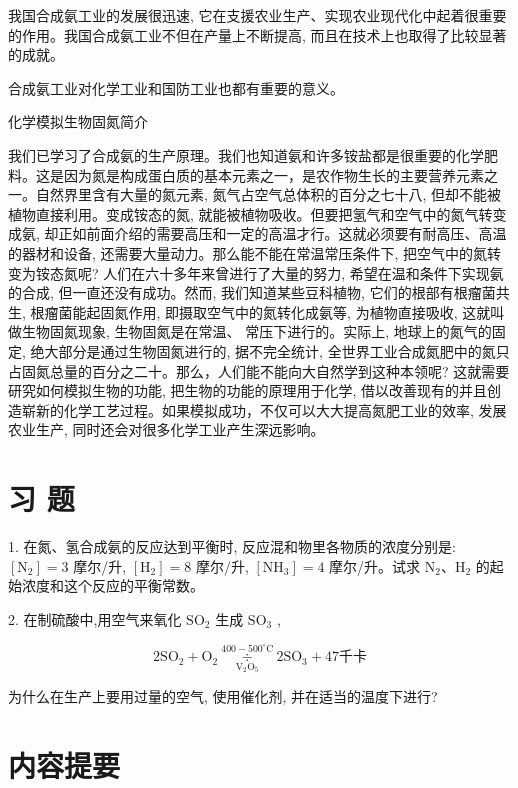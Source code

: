 \documentclass[10pt]{article}
\begin{document}
我国合成氨工业的发展很迅速, 它在支援农业生产、实现农业现代化中起着很重要的作用。我国合成氨工业不但在产量上不断提高, 而且在技术上也取得了比较显著的成就。

合成氨工业对化学工业和国防工业也都有重要的意义。

化学模拟生物固氮简介

我们已学习了合成氨的生产原理。我们也知道氨和许多铵盐都是很重要的化学肥料。这是因为氮是构成蛋白质的基本元素之一，是农作物生长的主要营养元素之一。自然界里含有大量的氮元素, 氮气占空气总体积的百分之七十八, 但却不能被植物直接利用。变成铵态的氮, 就能被植物吸收。但要把氢气和空气中的氮气转变成氨, 却正如前面介绍的需要高压和一定的高温才行。这就必须要有耐高压、高温的器材和设备, 还需要大量动力。那么能不能在常温常压条件下, 把空气中的氮转变为铵态氮呢? 人们在六十多年来曾进行了大量的努力, 希望在温和条件下实现氨的合成, 但一直还没有成功。然而, 我们知道某些豆科植物, 它们的根部有根瘤菌共生, 根瘤菌能起固氮作用, 即摄取空气中的氮转化成氨等, 为植物直接吸收, 这就叫做生物固氮现象, 生物固氮是在常温、 常压下进行的。实际上, 地球上的氮气的固定, 绝大部分是通过生物固氮进行的, 据不完全统计, 全世界工业合成氮肥中的氮只占固氮总量的百分之二十。那么，人们能不能向大自然学到这种本领呢? 这就需要研究如何模拟生物的功能, 把生物的功能的原理用于化学, 借以改善现有的并且创造崭新的化学工艺过程。如果模拟成功，不仅可以大大提高氮肥工业的效率, 发展农业生产, 同时还会对很多化学工业产生深远影响。

\section*{习 题}

1. 在氮、氢合成氨的反应达到平衡时, 反应混和物里各物质的浓度分别是: \(\left\lbrack {\mathrm{N}}_{2}\right\rbrack = 3\) 摩尔/升, \(\left\lbrack {\mathrm{H}}_{2}\right\rbrack = 8\) 摩尔/升, \(\left\lbrack {\mathrm{{NH}}}_{3}\right\rbrack = 4\) 摩尔/升。试求 \({\mathrm{N}}_{2}\text{、}{\mathrm{H}}_{2}\) 的起始浓度和这个反应的平衡常数。

2. 在制硫酸中,用空气来氧化 \({\mathrm{{SO}}}_{2}\) 生成 \({\mathrm{{SO}}}_{3}\) ,

\[
2{\mathrm{{SO}}}_{2} + {\mathrm{O}}_{2}\mathop{\div }\limits_{{{\mathrm{V}}_{2}{\mathrm{O}}_{5}}}^{{{400} - {500}^{ \circ }\mathrm{C}}}2{\mathrm{{SO}}}_{3} + {47}\text{千卡}
\]

为什么在生产上要用过量的空气, 使用催化剂, 并在适当的温度下进行?

\section*{内容提要}
\end{document}
